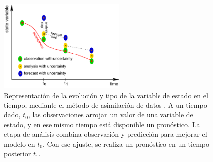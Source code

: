 \begin{figure}[htb!]
\centering
\includegraphics[width=0.55\textwidth]{Figs/gdas_data_assimilation.pdf}
\caption[Representación del método de asimilación de datos.]{Representación de la evolución y tipo de la variable de estado en el tiempo, mediante el método de asimilación de datos   \citep{GDAS_Auger}. A un tiempo dado, $ t_{0}$, las observaciones arrojan un valor de una variable de estado, y en ese mismo tiempo está disponible un pronóstico. La etapa de análisis combina observación y predicción para mejorar el modelo en $t_{0}$. Con ese ajuste, se realiza un pronóstico en un tiempo posterior $t_{1}$.}
        \label{fig:fig12}
\end{figure}


